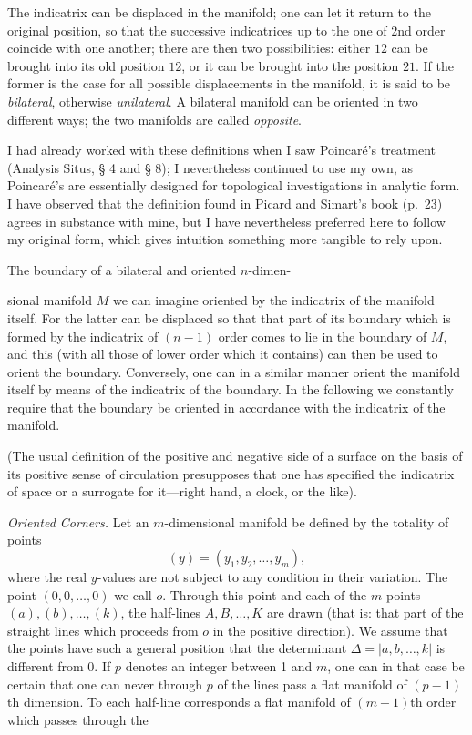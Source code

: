 \documentclass{article}
\begin{document}
The indicatrix can be displaced in the manifold; one can let it return to the original position, so that the successive indicatrices up to the one of 2nd order coincide with one another; there are then two possibilities: either $12$ can be brought into its old position $12$, or it can be brought into the position $21$. If the former is the case for all possible displacements in the manifold, it is said to be \emph{bilateral}, otherwise \emph{unilateral}. A bilateral manifold can be oriented in two different ways; the two manifolds are called \emph{opposite}.

I had already worked with these definitions when I saw Poincaré's treatment (Analysis Situs, § 4 and § 8); I nevertheless continued to use my own, as Poincaré's are essentially designed for topological investigations in analytic form. I have observed that the definition found in Picard and Simart's book (p.\ 23) agrees in substance with mine, but I have nevertheless preferred here to follow my original form, which gives intuition something more tangible to rely upon.

The boundary of a bilateral and oriented $n$-dimen-

sional manifold $M$ we can imagine oriented by the indicatrix of the manifold itself. For the latter can be displaced so that that part of its boundary which is formed by the indicatrix of $(n - 1)$ order comes to lie in the boundary of $M$, and this (with all those of lower order which it contains) can then be used to orient the boundary. Conversely, one can in a similar manner orient the manifold itself by means of the indicatrix of the boundary. In the following we constantly require that the boundary be oriented in accordance with the indicatrix of the manifold.

(The usual definition of the positive and negative side of a surface on the basis of its positive sense of circulation presupposes that one has specified the indicatrix of space or a surrogate for it---right hand, a clock, or the like).

\emph{Oriented Corners.} Let an $m$-dimensional manifold be defined by the totality of points
\[
(y) = (y_1, y_2, \dots, y_m),
\]
where the real $y$-values are not subject to any condition in their variation. The point $(0, 0, \dots, 0)$ we call $o$. Through this point and each of the $m$ points $(a), (b), \dots, (k)$, the half-lines $A, B, \dots, K$ are drawn (that is: that part of the straight lines which proceeds from $o$ in the positive direction). We assume that the points have such a general position that the determinant $\Delta = |a, b, \dots, k|$ is different from 0. If $p$ denotes an integer between 1 and $m$, one can in that case be certain that one can never through $p$ of the lines pass a flat manifold of $(p - 1)$th dimension. To each half-line corresponds a flat manifold of $(m - 1)$th order which passes through the
\end{document}
